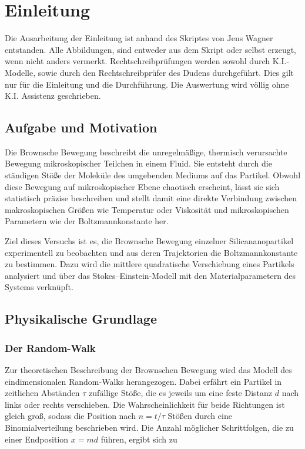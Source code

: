 \chapter{Einleitung} \label{ch:Einleitung}

Die Ausarbeitung der Einleitung ist anhand des Skriptes von Jens Wagner entstanden. Alle Abbildungen, sind entweder aus dem Skript oder selbst erzeugt, wenn nicht anders vermerkt. Rechtschreibprüfungen werden sowohl durch K.I.-Modelle, sowie durch den Rechtschreibprüfer des Dudens durchgeführt.  Dies gilt nur für die Einleitung und die Durchführung. Die Auswertung wird völlig ohne K.I. Assistenz geschrieben. \cite{skriptPAP21, Duden}


\section{Aufgabe und Motivation} \label{sec:AuM}

Die Brownsche Bewegung beschreibt die unregelmäßige, thermisch verursachte Bewegung mikroskopischer Teilchen in einem Fluid. Sie entsteht durch die ständigen Stöße der Moleküle des umgebenden Mediums auf das Partikel. Obwohl diese Bewegung auf mikroskopischer Ebene chaotisch erscheint, lässt sie sich statistisch präzise beschreiben und stellt damit eine direkte Verbindung zwischen makroskopischen Größen wie Temperatur oder Viskosität und mikroskopischen Parametern wie der Boltzmannkonstante her.

Ziel dieses Versuchs ist es, die Brownsche Bewegung einzelner Silicananopartikel experimentell zu beobachten und aus deren Trajektorien die Boltzmannkonstante zu bestimmen. Dazu wird die mittlere quadratische Verschiebung eines Partikels analysiert und über das Stokes–Einstein‑Modell mit den Materialparametern des Systems verknüpft.

\section{Physikalische Grundlage} \label{sec:PhyBasics}
\subsection{Der Random-Walk} \label{ssec:RndWalk}

Zur theoretischen Beschreibung der Brownschen Bewegung wird das Modell des eindimensionalen Random-Walks herangezogen. Dabei erfährt ein Partikel in zeitlichen Abständen \(\tau\) zufällige Stöße, die es jeweils um eine feste Distanz \(d\) nach links oder rechts verschieben. Die Wahrscheinlichkeit für beide Richtungen ist gleich groß, sodass die Position nach \(n = t/\tau\) Stößen durch eine Binomialverteilung beschrieben wird. Die Anzahl möglicher Schrittfolgen, die zu einer Endposition \(x = m d\) führen, ergibt sich zu

